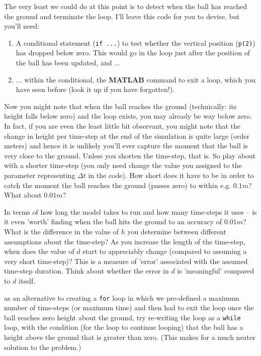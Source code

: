 \documentclass{tufte-book} %
\begin{document}
The very least we could do at this point is to detect when the ball has reached the ground and terminate the loop. I'll leave this code for you to devise, but you'll need:
\begin{enumerate}[noitemsep]
\setlength{\itemindent}{.2in}
\item A conditional statement (\texttt{if ...}) to test whether the vertical position (\texttt{p(2)}) has dropped below zero. This would go in the loop just after the position of the ball has been updated, and  ...
\item ... within the conditional, the \textbf{MATLAB} command to exit a loop, which you have seen before (look it up if you have forgotten!).
\end{enumerate}

Now you might note that when the ball reaches the ground (technically: its height falls below zero) and the loop exists, you may already be way below zero. In fact, if you are even the least little bit observant, you might note that the change in height per time-step at the end of the simulation is quite large (order meters) and hence it is unlikely you'll ever capture the moment that the ball is very close to the ground. Unless you shorten the time-step, that is. So play about with a shorter time-step (you only need change the value you assigned to the parameter representing \(\Delta t\) in the code). How short does it have to be in order to catch the moment the ball reaches the ground (passes zero) to within e.g. \(0.1 m\)? What about \(0.01 m\)? 

In terms of how long the model takes to run and how many time-steps it uses -- is it even 'worth' finding when the ball hits the ground to an accuracy of \(0.01 m\)? What is the difference in the value of \(h\) you determine between different assumptions about the time-step? As you increase the length of the time-step, when does the value of \(d\) start to appreciably change (compared to assuming a very short time-step)? This is a measure of 'error' associated with the assumed time-step duration. Think about whether the error in \(d\) is 'meaningful' compared to \(d\) itself.

 as an alternative to creating a \texttt{for} loop in which we pre-defined a maximum number of time-steps (or maximum time) and then  had to exit the loop once the ball reaches zero height about the ground, try re-writing the loop as a \texttt{while} loop, with the condition (for the loop to continue looping) that the ball has a height above the ground that is greater than zero. (This makes for a much neater solution to the problem.)
\end{document}
